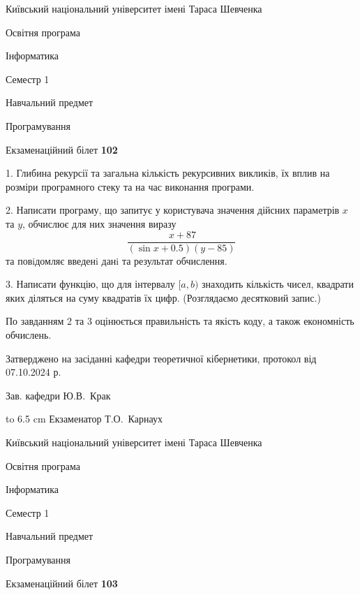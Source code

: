\documentclass[12pt, ukrainian]{article}
\begin{document}
\vspace{0.9cm}
{{\begin {scriptsize}\par
{ \center  Київський національний університет імені Тараса Шевченка \par}
{\parbox {5 cm}{Освітня програма \hfill}{\parbox {7 cm}{Інформатика\hfill}}\parbox {6 cm}{\hfill Семестр 1}}\par
{\parbox {5 cm} {Навчальний предмет \hfill}\parbox {7 cm}{Програмування \hfill}\parbox {6cm}{\hfill}\par}\vspace{-15pt} \end{scriptsize}}{\center Екзаменаційний білет \No \textbf { 102 }\par}}
{%
1. Глибина рекурсії та загальна кількість рекурсивних викликів, їх вплив на розміри програмного стеку та на час виконання програми.%
\par
2. Написати програму, що запитує у користувача значення дійсних параметрів $x$ та $y$, обчислює для них значення виразу 
$$\frac{\ x + 87}{(\sin x + 0.5) (y - 85)}$$ 
та повiдомляє введенi данi та результат обчислення.

\par
3. Написати функцію, що для інтервалу $[a, b)$ знаходить кількість чисел, квадрати яких діляться на суму квадратів їх цифр. (Розглядаємо десятковий запис.)

По завданням 2 та 3 оцінюється правильність та якість коду, а також економність обчислень.

}
{\smallskip\smallskip \begin {scriptsize} Затверджено на засіданні кафедри теоретичної кібернетики, протокол   від   07.10.2024 р.\par\smallskip\smallskip\smallskip\smallskip
{\parbox {6.5 cm} {Зав. кафедри \dotfill Ю.В.~Крак}}\hspace {0.7cm} {\hbox to 6.5 cm { Екзаменатор \dotfill Т.О.~Карнаух}} \end{scriptsize}}
\newpage
{{\begin {scriptsize}\par
{ \center  Київський національний університет імені Тараса Шевченка \par}
{\parbox {5 cm}{Освітня програма \hfill}{\parbox {7 cm}{Інформатика\hfill}}\parbox {6 cm}{\hfill Семестр 1}}\par
{\parbox {5 cm} {Навчальний предмет \hfill}\parbox {7 cm}{Програмування \hfill}\parbox {6cm}{\hfill}\par}\vspace{-15pt} \end{scriptsize}}{\center Екзаменаційний білет \No \textbf { 103 }\par}}
\end{document}
